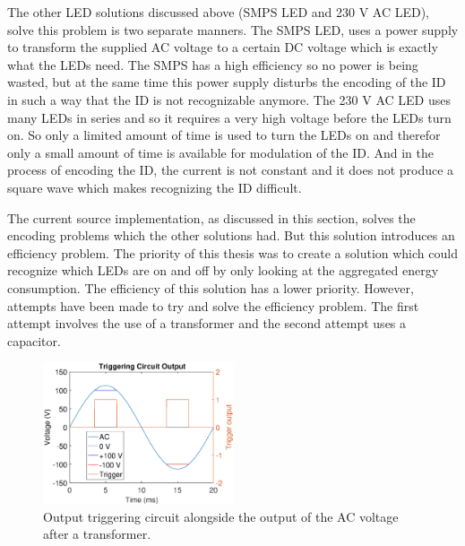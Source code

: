 	The other LED solutions discussed above (SMPS LED and 230 V AC LED), solve this problem is two separate manners.
	The SMPS LED, uses a power supply to transform the supplied AC voltage to a certain DC voltage which is exactly what the LEDs need.
	The SMPS has a high efficiency so no power is being wasted, but at the same time this power supply disturbs the encoding of the ID in such a way that the ID is not recognizable anymore.
	The 230 V AC LED uses many LEDs in series and so it requires a very high voltage before the LEDs turn on.
	So only a limited amount of time is used to turn the LEDs on and therefor only a small amount of time is available for modulation of the ID.
	And in the process of encoding the ID, the current is not constant and it does not produce a square wave which makes recognizing the ID difficult.


	The current source implementation, as discussed in this section, solves the encoding problems which the other solutions had.
	But this solution introduces an efficiency problem.
	The priority of this thesis was to create a solution which could recognize which LEDs are on and off by only looking at the aggregated energy consumption.
	The efficiency of this solution has a lower priority. %
	However, attempts have been made to try and solve the efficiency problem.
	The first attempt involves the use of a transformer and the second attempt uses a capacitor.

	\begin{figure}[htb]
		\centering
		\includegraphics[angle=0,width=0.5\textwidth]{chapters/hardware-chapters/AC/ac-modulator/custom-hardware/ac-current-source/ac-wave-lower-transformed-triggering.eps}
		\caption{Output triggering circuit alongside the output of the AC voltage after a transformer.}
		\label{fig:trigger-output-lower-transformed}
	\end{figure}


